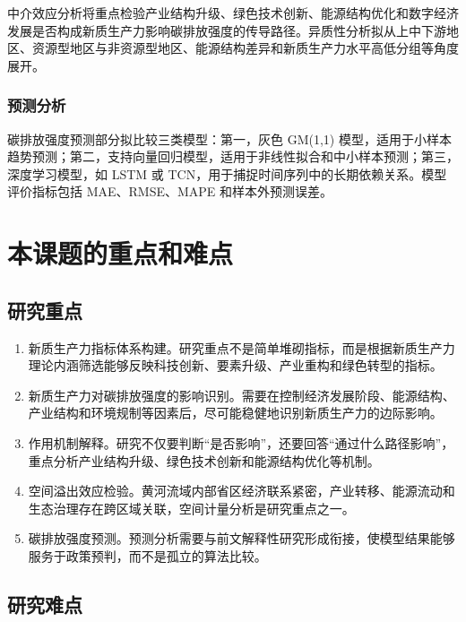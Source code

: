 \documentclass[UTF8,a4paper,zihao=-4,fontset=windows]{ctexart}
\newcommand{\regionscope}{黄河流域}
\begin{document}
中介效应分析将重点检验产业结构升级、绿色技术创新、能源结构优化和数字经济发展是否构成新质生产力影响碳排放强度的传导路径。异质性分析拟从上中下游地区、资源型地区与非资源型地区、能源结构差异和新质生产力水平高低分组等角度展开。

\subsubsection{预测分析}

碳排放强度预测部分拟比较三类模型：第一，灰色 GM(1,1) 模型，适用于小样本趋势预测；第二，支持向量回归模型，适用于非线性拟合和中小样本预测；第三，深度学习模型，如 LSTM 或 TCN，用于捕捉时间序列中的长期依赖关系。模型评价指标包括 MAE、RMSE、MAPE 和样本外预测误差。

\section{本课题的重点和难点}

\subsection{研究重点}

\begin{enumerate}[label=\arabic*.]
  \item 新质生产力指标体系构建。研究重点不是简单堆砌指标，而是根据新质生产力理论内涵筛选能够反映科技创新、要素升级、产业重构和绿色转型的指标。
  \item 新质生产力对碳排放强度的影响识别。需要在控制经济发展阶段、能源结构、产业结构和环境规制等因素后，尽可能稳健地识别新质生产力的边际影响。
  \item 作用机制解释。研究不仅要判断“是否影响”，还要回答“通过什么路径影响”，重点分析产业结构升级、绿色技术创新和能源结构优化等机制。
  \item 空间溢出效应检验。\regionscope 内部省区经济联系紧密，产业转移、能源流动和生态治理存在跨区域关联，空间计量分析是研究重点之一。
  \item 碳排放强度预测。预测分析需要与前文解释性研究形成衔接，使模型结果能够服务于政策预判，而不是孤立的算法比较。
\end{enumerate}

\subsection{研究难点}
\end{document}
